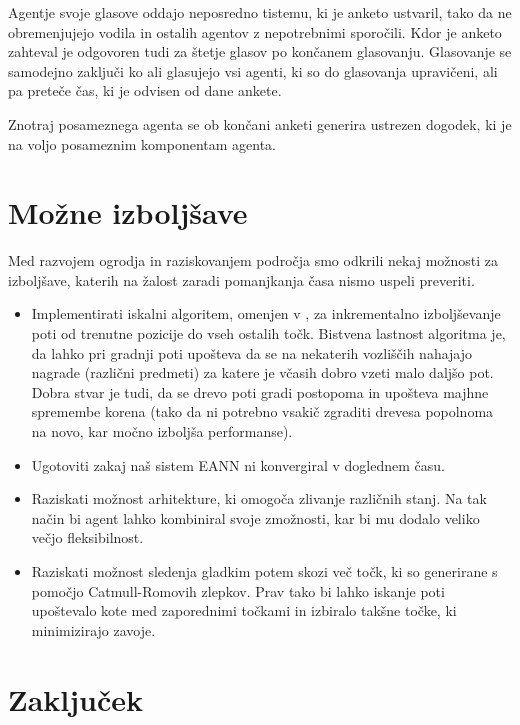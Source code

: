 \documentclass[a4paper,10pt]{article}
\begin{document}
Agentje svoje glasove oddajo neposredno tistemu, ki je anketo ustvaril, tako da ne obremenjujejo vodila in ostalih agentov z nepotrebnimi sporočili. Kdor je anketo zahteval je odgovoren tudi za štetje glasov po končanem glasovanju. Glasovanje se samodejno zaključi ko ali glasujejo vsi agenti, ki so do glasovanja upravičeni, ali pa preteče čas, ki je odvisen od dane ankete.

Znotraj posameznega agenta se ob končani anketi generira ustrezen dogodek, ki je na voljo posameznim komponentam agenta. 

\section{Možne izboljšave}

Med razvojem ogrodja in raziskovanjem področja smo odkrili nekaj možnosti za izboljšave, katerih na žalost zaradi pomanjkanja časa nismo uspeli preveriti.

\begin{itemize}
  \item Implementirati iskalni algoritem, omenjen v \cite{champandard02}, za inkrementalno izboljševanje poti od trenutne pozicije do vseh ostalih točk. Bistvena lastnost algoritma je, da lahko pri gradnji poti upošteva da se na nekaterih vozliščih nahajajo nagrade (različni predmeti) za katere je včasih dobro vzeti malo daljšo pot. Dobra stvar je tudi, da se drevo poti gradi postopoma in upošteva majhne spremembe korena (tako da ni potrebno vsakič zgraditi drevesa popolnoma na novo, kar močno izboljša performanse).
  
  \item Ugotoviti zakaj naš sistem EANN ni konvergiral v doglednem času.
  
  \item Raziskati možnost arhitekture, ki omogoča zlivanje različnih stanj. Na tak način bi agent lahko kombiniral svoje zmožnosti, kar bi mu dodalo veliko večjo fleksibilnost.
  
  \item Raziskati možnost sledenja gladkim potem skozi več točk, ki so generirane s pomočjo Catmull-Romovih zlepkov. Prav tako bi lahko iskanje poti upoštevalo kote med zaporednimi točkami in izbiralo takšne točke, ki minimizirajo zavoje.
\end{itemize}

\section{Zaključek}
\end{document}
